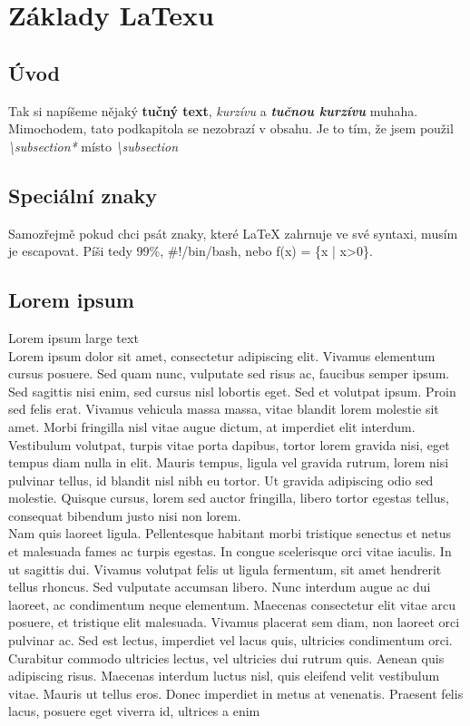 \documentclass[10pt,a4paper]{article}
\begin{document}
	\tableofcontents
	\newpage

	\section{Základy LaTexu}	
		\subsection*{Úvod}	
		Tak si napíšeme nějaký \textbf{tučný text}, \textit{kurzívu} a \textbf{\textit{tučnou kurzívu}} muhaha. Mimochodem, tato podkapitola se nezobrazí v obsahu. Je to tím, že jsem použil \textit{\textbackslash{}subsection*} místo \textit{\textbackslash{}subsection}\\
	
		\subsection{Speciální znaky}
	Samozřejmě pokud chci psát znaky, které LaTeX zahrnuje ve své syntaxi, musím je escapovat. Píši tedy 99\%, \#!/bin/bash, nebo f(x) = \{x | x>0\}.
	
		\subsection{Lorem ipsum}
		\Large{Lorem ipsum large text}\normalsize \\
	Lorem ipsum dolor sit amet, consectetur adipiscing elit. Vivamus elementum cursus posuere. Sed quam nunc, vulputate sed risus ac, faucibus semper ipsum. Sed sagittis nisi enim, sed cursus nisl lobortis eget. Sed et volutpat ipsum. Proin sed felis erat. Vivamus vehicula massa massa, vitae blandit lorem molestie sit amet. Morbi fringilla nisl vitae augue dictum, at imperdiet elit interdum. Vestibulum volutpat, turpis vitae porta dapibus, tortor lorem gravida nisi, eget tempus diam nulla in elit. Mauris tempus, ligula vel gravida rutrum, lorem nisi pulvinar tellus, id blandit nisl nibh eu tortor. Ut gravida adipiscing odio sed molestie. Quisque cursus, lorem sed auctor fringilla, libero tortor egestas tellus, consequat bibendum justo nisi non lorem.\\

		Nam quis laoreet ligula. Pellentesque habitant morbi tristique senectus et netus et malesuada fames ac turpis egestas. In congue scelerisque orci vitae iaculis. In ut sagittis dui. Vivamus volutpat felis ut ligula fermentum, sit amet hendrerit tellus rhoncus. Sed vulputate accumsan libero. Nunc interdum augue ac dui laoreet, ac condimentum neque elementum. Maecenas consectetur elit vitae arcu posuere, et tristique elit malesuada. Vivamus placerat sem diam, non laoreet orci pulvinar ac. Sed est lectus, imperdiet vel lacus quis, ultricies condimentum orci. Curabitur commodo ultricies lectus, vel ultricies dui rutrum quis. Aenean quis adipiscing risus. Maecenas interdum luctus nisl, quis eleifend velit vestibulum vitae. Mauris ut tellus eros. Donec imperdiet in metus at venenatis. Praesent felis lacus, posuere eget viverra id, ultrices a enim
	
\end{document}
